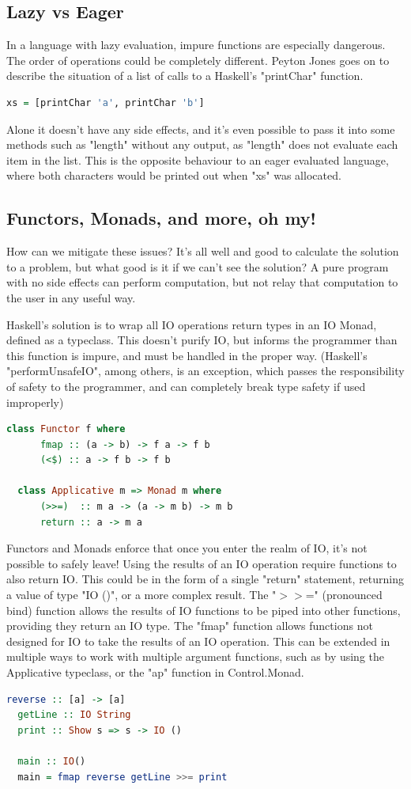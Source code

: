 \documentclass[a4paper]{article}
\begin{document}
\subsection{Lazy vs Eager}
In a language with lazy evaluation, impure functions are especially dangerous. The order of operations could be completely different. Peyton Jones goes on to describe the situation of a list of calls to a Haskell's "printChar" function.
\begin{lstlisting}[language=haskell, caption=An example of lazy evaluation gone awry with IO.]
  xs = [printChar 'a', printChar 'b']
\end{lstlisting}
Alone it doesn't have any side effects, and it's even possible to pass it into some methods such as "length" without any output, as "length" does not evaluate each item in the list.
This is the opposite behaviour to an eager evaluated language, where both characters would be printed out when "xs" was allocated. 
\subsection{Functors, Monads, and more, oh my!}
How can we mitigate these issues? It's all well and good to calculate the solution to a problem, but what good is it if we can't see the solution? A pure program with no side effects can perform computation, but not relay that computation to the user in any useful way.

Haskell's solution is to wrap all IO operations return types in an IO Monad, defined as a typeclass. This doesn't purify IO, but informs the programmer than this function is impure, and must be handled in the proper way. (Haskell's "performUnsafeIO", among others, is an exception, which passes the responsibility of safety to the programmer, and can completely break type safety if used improperly)
\begin{lstlisting}[language=haskell, caption=Haskell's Functor and Monad typeclasses.]
  class Functor f where
      fmap :: (a -> b) -> f a -> f b
      (<$) :: a -> f b -> f b
        
  class Applicative m => Monad m where
      (>>=)  :: m a -> (a -> m b) -> m b
      return :: a -> m a
\end{lstlisting}
Functors and Monads enforce that once you enter the realm of IO, it's not possible to safely leave! Using the results of an IO operation require functions to also return IO.
This could be in the form of a single "return" statement, returning a value of type "IO ()", or a more complex result.
The "$>>$=" (pronounced bind) function allows the results of IO functions to be piped into other functions, providing they return an IO type.
The "fmap" function allows functions not designed for IO to take the results of an IO operation. This can be extended in multiple ways to work with multiple argument functions, such as by using the Applicative typeclass, or the "ap" function in Control.Monad.
\begin{lstlisting}[language=haskell, caption=fmap and bind allow IO operations to be used safely]
  reverse :: [a] -> [a]
  getLine :: IO String
  print :: Show s => s -> IO ()

  main :: IO()
  main = fmap reverse getLine >>= print
\end{lstlisting}
\end{document}
